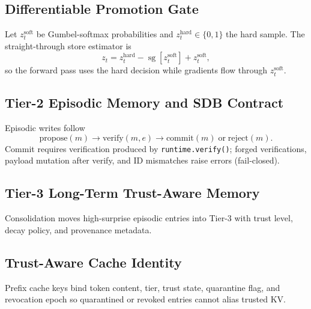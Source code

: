 \subsection{Differentiable Promotion Gate}


Let $z_t^{\mathrm{soft}}$ be Gumbel-softmax probabilities and
$z_t^{\mathrm{hard}} \in \{0,1\}$ the hard sample.
The straight-through store estimator is
\begin{equation}
  z_t = z_t^{\mathrm{hard}} - \operatorname{sg}\!\left[z_t^{\mathrm{soft}}\right] + z_t^{\mathrm{soft}},
\end{equation}
so the forward pass uses the hard decision while gradients flow through
$z_t^{\mathrm{soft}}$.

\subsection{Tier-2 Episodic Memory and SDB Contract}


Episodic writes follow
\begin{equation}
  \mathrm{propose}(m) \rightarrow \mathrm{verify}(m, e) \rightarrow
  \mathrm{commit}(m) \;\text{or}\; \mathrm{reject}(m).
\end{equation}
Commit requires verification produced by \texttt{runtime.verify()};
forged verifications, payload mutation after verify, and ID mismatches
raise errors (fail-closed).

\subsection{Tier-3 Long-Term Trust-Aware Memory}


Consolidation moves high-surprise episodic entries into Tier-3 with
trust level, decay policy, and provenance metadata.

\subsection{Trust-Aware Cache Identity}


Prefix cache keys bind token content, tier, trust state, quarantine flag,
and revocation epoch so quarantined or revoked entries cannot alias trusted KV.

